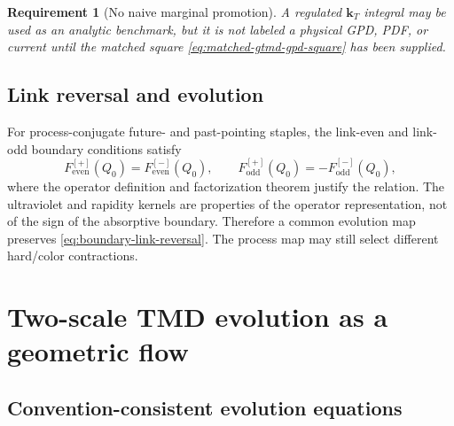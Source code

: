 \documentclass[11pt]{article}
\newtheorem{requirement}[definition]{Requirement}
\newcommand{\kT}{\bm{k}_{T}}
\newcommand{\even}{\mathrm{even}}
\newcommand{\odd}{\mathrm{odd}}
\begin{document}
\begin{requirement}[No naive marginal promotion]
A regulated \(\kT\) integral may be used as an analytic benchmark, but it is
not labeled a physical GPD, PDF, or current until the matched square
\cref{eq:matched-gtmd-gpd-square} has been supplied.
\end{requirement}

\subsection{Link reversal and evolution}

For process-conjugate future- and past-pointing staples, the link-even and
link-odd boundary conditions satisfy
\begin{equation}
 F_{\even}^{[+]}(Q_0)=F_{\even}^{[-]}(Q_0),
 \qquad
 F_{\odd}^{[+]}(Q_0)=-F_{\odd}^{[-]}(Q_0),
 \label{eq:boundary-link-reversal}
\end{equation}
where the operator definition and factorization theorem justify the relation.
The ultraviolet and rapidity kernels are properties of the operator
representation, not of the sign of the absorptive boundary.  Therefore a
common evolution map preserves \cref{eq:boundary-link-reversal}.  The process
map may still select different hard/color contractions.


\section{Two-scale TMD evolution as a geometric flow}
\label{sec:two-scale-evolution}

\subsection{Convention-consistent evolution equations}
\end{document}
